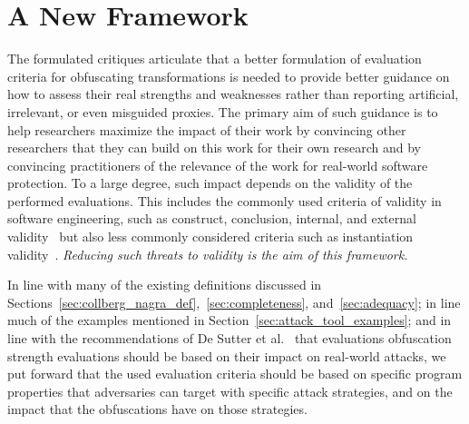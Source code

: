 \section{A New Framework}
The formulated critiques articulate that a better formulation of evaluation criteria for obfuscating transformations is needed to provide better guidance on how to assess their real strengths and weaknesses rather than reporting artificial, irrelevant, or even misguided proxies. The primary aim of such guidance is to help researchers maximize the impact of their work by convincing other researchers that they can build on this work for their own research and by convincing practitioners of the relevance of the work for real-world software protection. To a large degree, such impact depends on the validity of the performed evaluations. This includes the commonly used criteria of validity in software engineering, such as construct, conclusion, internal, and external validity~\cite{Wohlin} but also less commonly considered criteria such as instantiation validity~\cite{lukyanenko2014instantiation}. \emph{Reducing such threats to validity is the aim of this framework.} 

In line with many of the existing definitions discussed in Sections~\ref{sec:collberg_nagra_def},~\ref{sec:completeness}, and~\ref{sec:adequacy}; in line much of the examples mentioned in Section~\ref{sec:attack_tool_examples}; and in line with the recommendations of De Sutter et al.~\cite{desutter2024evaluation} that evaluations obfuscation strength evaluations should be based on their impact on real-world attacks, we put forward that the used evaluation criteria should be based on specific program properties that adversaries can target with specific attack strategies, and on the impact that the obfuscations have on those strategies. 

